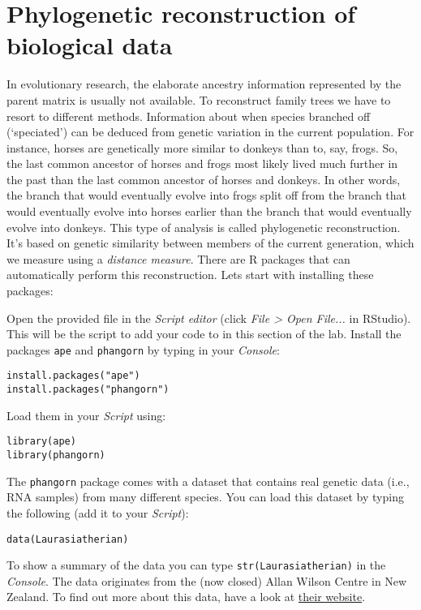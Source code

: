\documentclass[a4paper, 9pt]{article}
\begin{document}
\section{Phylogenetic reconstruction of biological data}\label{phylogenetic-reconstruction-with-r}

In evolutionary research, the elaborate ancestry information represented
by the parent matrix is usually not available. To reconstruct family
trees we have to resort to different methods. Information about when
species branched off (`speciated') can be deduced from genetic variation
in the current population. For instance, horses are genetically more
similar to donkeys than to, say, frogs. So, the last common ancestor of
horses and frogs most likely lived much further in the past than the
last common ancestor of horses and donkeys. In other words, the branch
that would eventually evolve into frogs split off from the branch that
would eventually evolve into horses earlier than the branch that would
eventually evolve into donkeys. This type of analysis is called
phylogenetic reconstruction. It's based on genetic similarity between
members of the current generation, which we measure using a
\emph{distance measure}. There are R packages that can automatically
perform this reconstruction. Lets start with installing these packages:

\begin{exercise}
\action Open the provided  file in the \emph{Script editor} (click \emph{File > Open File...} in RStudio). This will be the script to add your code to in this section of the lab. 
    \action Install the packages \texttt{ape} and \texttt{phangorn} by typing in your \emph{Console}:\begin{lstlisting}
install.packages("ape")
install.packages("phangorn")      
\end{lstlisting}
Load them in your \emph{Script} using:\begin{lstlisting}
library(ape)
library(phangorn)
\end{lstlisting}
\end{exercise}

The \texttt{phangorn} package comes with a dataset that contains real
genetic data (i.e., RNA samples) from many different species. You can
load this dataset by typing the following (add it to your \emph{Script}):
\begin{lstlisting}
data(Laurasiatherian)
\end{lstlisting}
To show a summary of the data you can type
\texttt{str(Laurasiatherian)} in the \emph{Console}. The data originates from the (now closed) Allan Wilson Centre in New Zealand. To find out more
about this data, have a look at \href{http://www.allanwilsoncentre.ac.nz/massey/learning/departments/centres-research/allan-wilson-centre/our-research/resources/software-and-supplementary-materials.cfm}{their website}.
\end{document}
